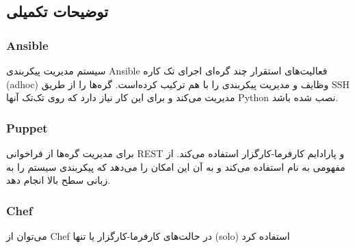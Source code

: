 \subsection{توضیحات تکمیلی}
\subsubsection{Ansible}
سیستم مدیریت پیکربندی Ansible فعالیت‌های استقرار چند گره‌ای
اجرای  تک کاره (adhoc) وظایف و مدیریت پیکربندی را با هم ترکیب کرده‌است.
گره‌ها را از طریق SSH مدیریت می‌کند و برای این کار نیاز دارد که روی تک‌تک آنها Python نصب شده باشد.

\subsubsection{Puppet}
برای مدیریت گره‌ها از فراخوانی REST و پارادایم کارفرما-کارگزار استفاده می‌کند.
از مفهومی به نام 
استفاده می‌کند و به آن این امکان را می‌دهد که پیکربندی سیستم را به زبانی سطح بالا انجام دهد.

\subsubsection{Chef}
می‌توان از Chef در حالت‌های کارفرما-کارگزار یا تنها (solo) استفاده کرد



